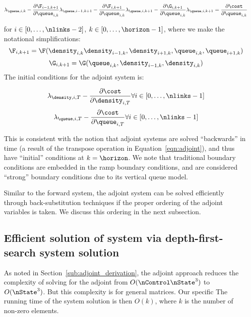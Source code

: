 \begin{equation}
\label{eqn:adj-queue}
\begin{aligned}
\adj{\queue}{i}{k} - \gFik{i-1}{k+1} - \gFik{i}{k+1} - \gGik{i}{k+1} = \pFrac{\cost}{\idx{\queue}{i}{k}}
\end{aligned}
\end{equation}

for $i\in\left[0,\ldots,\nlinks-2\right]$, $ k\in\left[0,\ldots,\horizon-1\right]$, where we make the notational simplifications:
\[
\F_{i,k+1} = \F(\idx{\density}{i}{k}
        \idx{\density}{i-1}{k}, 
        \idx{\density}{i+1}{k}, 
        \idx{\queue}{i}{k}, 
        \idx{\queue}{i+1}{k})
\]
\[\G_{i,k+1} = \G(\idx{\queue}{i}{k}, 
        \idx{\density}{i-1}{k}, 
        \idx{\density}{i}{k})
\]
The initial conditions for the adjoint system is:

\[
\adj{\density}{i}{T} - \pFrac{\cost}{\idx{\density}{i}{T}} \forall i\in\left[0,\ldots,\nlinks-1\right]
\]
\[
\adj{\queue}{i}{T} - \pFrac{\cost}{\idx{\queue}{i}{T}} \forall i\in\left[0,\ldots,\nlinks-1\right]
\]

This is consistent with the notion that adjoint systems are solved ``backwards'' in time (a result of the transpose operation in Equation~\eqref{eqn:adjoint}), and thus have ``initial'' conditions at $k=\horizon$. We note that traditional boundary conditions are embedded in the ramp boundary conditions, and are considered ``strong'' boundary conditions due to its vertical queue model.

Similar to the forward system, the adjoint system can be solved efficiently through back-substitution techniques if the proper ordering of the adjoint variables is taken. We discuss this ordering in the next subsection.


\subsection{Efficient solution of system via depth-first-search system solution} %
\label{sub:efficient_solution_of_system_via_depth_first_search_system_solution}

As noted in Section~\ref{sub:adjoint_derivation}, the adjoint approach reduces the complexity of solving for the adjoint from $O(\nControl\nState^3)$ to $O(\nState^3)$. But this complexity is for general matrices. Our specific
The running time of the system solution is then $O\left(k\right)$, where $k$ is the number of non-zero elements.

